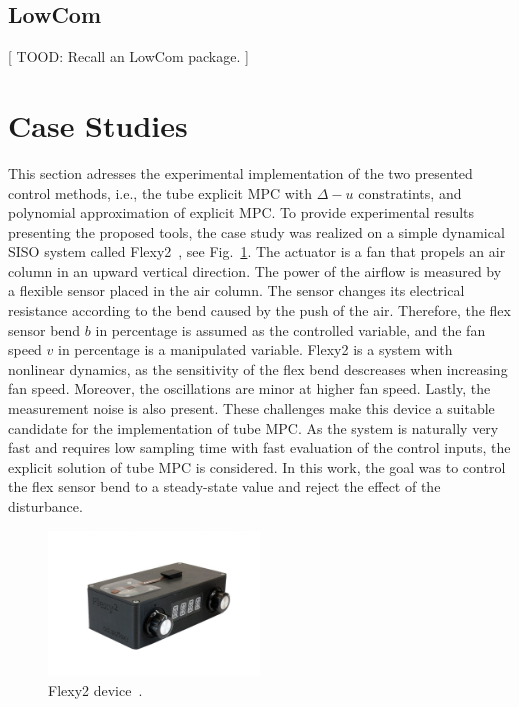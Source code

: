 \documentclass[letterpaper, 10 pt, conference]{ieeeconf}
\begin{document}
\subsection{LowCom}
\label{sec:code_mpt3lowcom}

[ TOOD: Recall an LowCom package. ]

\section{Case Studies}
\label{sec:case_study}
This section adresses the experimental implementation of the two presented control methods, i.e., the tube explicit MPC with $\Delta-u$ constratints, and polynomial approximation of explicit MPC. To provide experimental results presenting the proposed tools, the case study was realized on a simple dynamical SISO system called Flexy2~\cite{flexy2}, see Fig.~\ref{fig:flexy2}. The actuator is a fan that propels an air column in an upward vertical direction. The power of the airflow is measured
by a flexible sensor placed in the air column. The sensor changes its electrical resistance according to the bend caused by the push of the air. Therefore, the flex sensor bend $b$ in percentage is assumed as the controlled variable, and the fan speed $v$ in percentage is a manipulated variable. Flexy2 is a system with nonlinear dynamics, as the sensitivity of the flex bend descreases when increasing fan speed. Moreover, the oscillations are minor at higher fan speed. Lastly, the measurement noise is also present. These challenges make this device a suitable candidate for the implementation of tube MPC. As the system is naturally very fast and requires low sampling time with fast evaluation of the control inputs, the explicit solution of tube MPC is considered. In this work, the goal was to control the flex sensor bend to a steady-state value and reject the effect of the disturbance.

\begin{figure}
	\begin{center}
		\includegraphics[width=0.5\textwidth]{images/flexy2}
		\caption{Flexy2 device~\cite{flexy2}.}
		\label{fig:flexy2}
	\end{center}
\end{figure}
\end{document}
